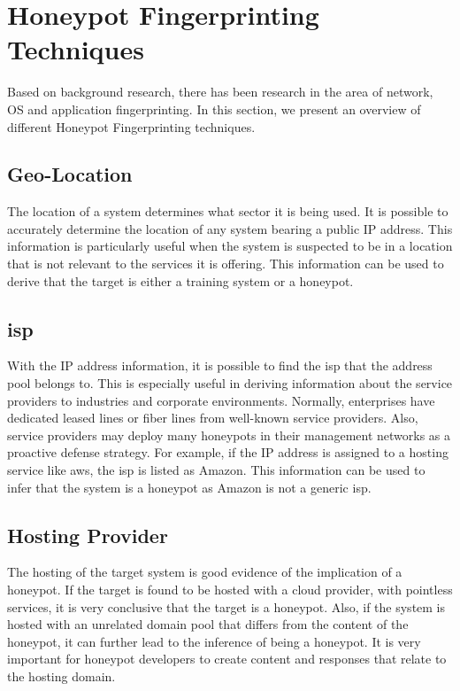 \section{Honeypot Fingerprinting Techniques}
\label{sec:hft}

Based on background research, there has been research in the area of network, OS and application fingerprinting. In this section, we present an overview of different Honeypot Fingerprinting techniques. 

\subsection{Geo-Location}
The location of a system determines what sector it is being used. It is possible to accurately determine the location of any system bearing a public IP address. This information is particularly useful when the system is suspected to be in a location that is not relevant to the services it is offering. This information can be used to derive that the target is either a training system or a honeypot. 

\subsection{\acrfull{isp}}
With the IP address information, it is possible to find the \acrshort{isp} that the address pool belongs to. This is especially useful in deriving information about the service providers to industries and corporate environments. Normally, enterprises have dedicated leased lines or fiber lines from well-known service providers. Also, service providers may deploy many honeypots in their management networks as a proactive defense strategy. For example, if the IP address is assigned to a hosting service like \acrshort{aws}, the \acrshort{isp} is listed as Amazon. This information can be used to infer that the system is a honeypot as Amazon is not a generic \acrshort{isp}. 

\subsection{Hosting Provider}
The hosting of the target system is good evidence of the implication of a honeypot. If the target is found to be hosted with a cloud provider, with pointless services, it is very conclusive that the target is a honeypot. Also, if the system is hosted with an unrelated domain pool that differs from the content of the honeypot, it can further lead to the inference of being a honeypot. It is very important for honeypot developers to create content and responses that relate to the hosting domain. 


